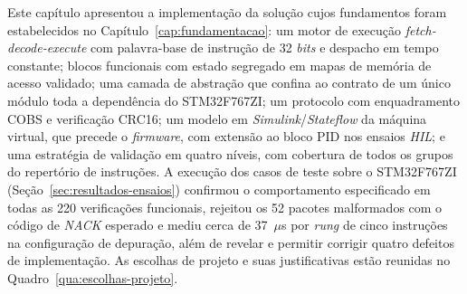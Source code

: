 Este capítulo apresentou a implementação da solução cujos fundamentos foram estabelecidos no Capítulo~\ref{cap:fundamentacao}: um motor de execução \textit{fetch-decode-execute} com palavra-base de instrução de 32 \textit{bits} e despacho em tempo constante; blocos funcionais com estado segregado em mapas de memória de acesso validado; uma camada de abstração que confina ao contrato de um único módulo toda a dependência do STM32F767ZI; um protocolo com enquadramento COBS e verificação CRC16; um modelo em \textit{Simulink}/\textit{Stateflow} da máquina virtual, que precede o \textit{firmware}, com extensão ao bloco PID nos ensaios \textit{HIL}; e uma estratégia de validação em quatro níveis, com cobertura de todos os grupos do repertório de instruções.
A execução dos casos de teste sobre o STM32F767ZI (Seção~\ref{sec:resultados-ensaios}) confirmou o comportamento especificado em todas as 220 verificações funcionais, rejeitou os 52 pacotes malformados com o código de \textit{NACK} esperado e mediu cerca de 37~$\mu$s por \textit{rung} de cinco instruções na configuração de depuração, além de revelar e permitir corrigir quatro defeitos de implementação.
As escolhas de projeto e suas justificativas estão reunidas no Quadro~\ref{qua:escolhas-projeto}.

